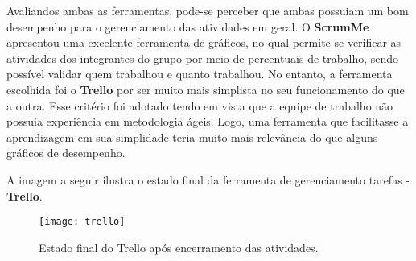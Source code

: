 		Avaliandos ambas as ferramentas, pode-se perceber que ambas possuiam um bom desempenho para o gerenciamento das atividades em geral. O \textbf{ScrumMe} apresentou uma excelente ferramenta de gráficos, no qual permite-se verificar as atividades dos integrantes do grupo por meio de percentuais de trabalho, sendo possível validar quem trabalhou e quanto trabalhou. No entanto, a ferramenta escolhida foi o \textbf{Trello} por ser muito mais simplista no seu funcionamento do que a outra. Esse critério foi adotado tendo em vista que a equipe de trabalho não possuia experiência em metodologia ágeis. Logo, uma ferramenta que facilitasse a aprendizagem em sua simplidade teria muito mais relevância do que alguns gráficos de desempenho.

		A imagem a seguir ilustra o estado final da ferramenta de gerenciamento tarefas - \textbf{Trello}.
		\newpage
		\begin{figure}[h]
			\centering
			\texttt{[image: trello]}
			\caption[Estado final do Trello após encerramento das atividades]{Estado final do Trello após encerramento das atividades.}
			\label{fig:trello}
		\end{figure}